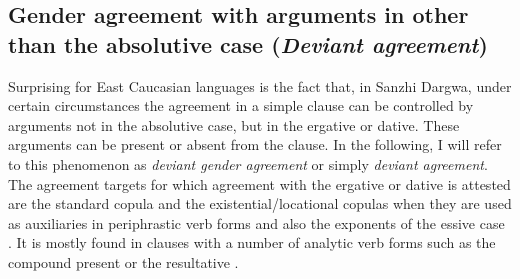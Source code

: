 
\subsection{Gender agreement with arguments in other than the absolutive case (\textit{Deviant agreement})}
\label{ssec:Gender agreement with arguments in other than the absolutive case}

Surprising for East Caucasian languages is the fact that, in Sanzhi Dargwa, under certain circumstances the agreement in a simple clause can be controlled by arguments not in the absolutive case, but in the ergative or dative. These arguments can be present or absent from the clause. In the following, I will refer to this phenomenon as \textit{deviant gender agreement} or simply \textit{deviant agreement}. The agreement targets for which agreement with the ergative or dative is attested are the standard copula  and the existential/locational copulas  when they are used as auxiliaries in periphrastic verb forms and also the exponents of the essive case . It is mostly found in clauses with a number of analytic verb forms such as the compound present  or the resultative . 

